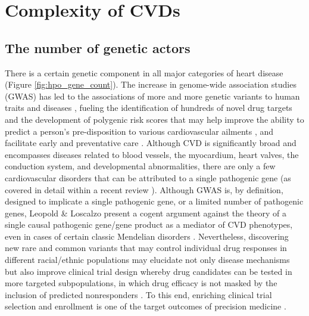 \documentclass[letter]{bioinfo}
\begin{document}
	
	\section*{Complexity of CVDs}  %
	\subsection*{The number of genetic actors}
	
There is a certain genetic component in all major categories of heart disease (Figure \ref{fig:hpo_gene_count}). The increase in genome-wide association studies (GWAS) has led to the associations of more and more genetic variants to human traits and diseases \citep{Visscher:2017:10}, fueling the identification of hundreds of novel drug targets and the development of polygenic risk scores that may help improve the ability to predict a person's pre-disposition to various cardiovascular ailments \citep{Ganna:2013:Multilocus,Goldstein:2014:Simple,Krarup:2015:genetic,Tada:2016:Risk,Abraham:2016:Genomic}, and facilitate early and preventative care \citep{Assimes:2016:Genetic}.  Although CVD is significantly broad and encompasses diseases related to blood vessels, the myocardium, heart valves, the conduction system, and developmental abnormalities, there are only a few cardiovascular disorders that can be attributed to a single pathogenic gene (as covered in detail within a recent review \citep{Leopold:2018:Emerging}).  Although GWAS is, by definition, designed to implicate a single pathogenic gene, or a limited number of pathogenic genes, Leopold \& Loscalzo present a cogent argument against the theory of a single causal pathogenic gene/gene product as a mediator of CVD phenotypes, even in cases of certain classic Mendelian disorders \citep{Leopold:2018:Emerging}.  Nevertheless, discovering new rare and common variants that may control individual drug responses in different racial/ethnic populations may elucidate not only disease mechanisms but also improve clinical trial design whereby drug candidates can be tested in more targeted subpopulations, in which drug efficacy is not masked by the inclusion of predicted nonresponders \citep{Lau:2018:Omics}.  To this end, enriching clinical trial selection and enrollment is one of the target outcomes of precision medicine \citep{Leopold:2018:Emerging}.  
\end{document}
